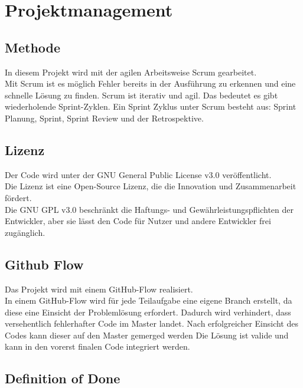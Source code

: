 \chapter{Projektmanagement}\label{ch:projektmanagement}

\section{Methode}\label{sec:methode}

In diesem Projekt wird mit der agilen Arbeitsweise Scrum gearbeitet.\\
Mit Scrum ist es möglich Fehler bereits in der Ausführung zu erkennen und eine schnelle Lösung zu finden.
Scrum ist iterativ und agil. Das bedeutet es gibt wiederholende Sprint-Zyklen.
Ein Sprint Zyklus unter Scrum besteht aus: Sprint Planung, Sprint, Sprint Review und der Retrospektive.

\section{Lizenz}\label{sec:lizenz}

Der Code wird unter der GNU General Public License v3.0 veröffentlicht.\\
Die Lizenz ist eine Open-Source Lizenz, die die Innovation und Zusammenarbeit fördert.\\
Die GNU GPL v3.0 beschränkt die Haftungs- und Gewährleistungspflichten der Entwickler, aber sie lässt den Code für Nutzer und andere Entwickler frei zugänglich.

\section{Github Flow}\label{sec:github-flow}

Das Projekt wird mit einem GitHub-Flow realisiert.\\
In einem GitHub-Flow wird für jede Teilaufgabe eine eigene Branch erstellt, da diese eine Einsicht der Problemlösung erfordert.
Dadurch wird verhindert, dass versehentlich fehlerhafter Code im Master landet. Nach erfolgreicher Einsicht des Codes kann dieser auf den Master gemerged werden \dah{} Die Lösung ist valide und kann in den vorerst finalen Code integriert werden.

\section{Definition of Done}\label{sec:dod}

